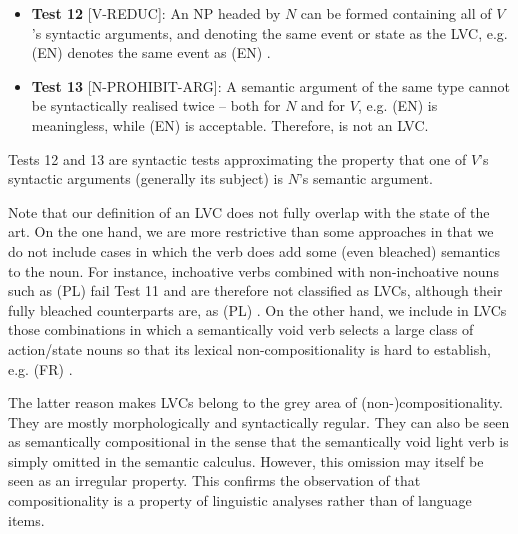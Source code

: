 \documentclass[output=paper,
modfonts,
]{langscibook}
\begin{document}
\begin{itemize}
\item[] \textbf{Test 12} [V-REDUC]: An NP headed by $N$ can be formed containing all of $V$'s syntactic arguments, and denoting the same event or state as the LVC, e.g. (EN)  denotes the same event as (EN) . 

\item[] \textbf{Test 13} [N-PROHIBIT-ARG]: A semantic argument of the same type cannot be syntactically realised twice -- both for $N$ and for $V$, e.g. (EN)  is meaningless, while (EN)  is acceptable. Therefore,  is not an LVC. %
    
\end{itemize}

Tests 12 and 13 are syntactic tests approximating the property that one of $V$'s syntactic arguments (generally its subject) is $N$'s semantic argument.

Note that our definition of an LVC does not fully overlap with the state of the art. On the one hand, we are more restrictive than some approaches in that we do not include cases in which the verb does add some (even bleached) semantics to the noun. For instance, inchoative verbs combined with non-inchoative nouns such as (PL)  fail Test 11 and are therefore not classified as LVCs, although their fully bleached counterparts are, as (PL) . On the other hand, we include in LVCs those combinations in which a semantically void verb selects a large class of action/state nouns so that its lexical non-com\-po\-si\-tio\-na\-li\-ty is hard to establish, e.g. (FR)  .

The latter reason makes LVCs belong to the grey area of (non-)com\-po\-si\-tio\-na\-li\-ty. 
They are mostly morphologically and syntactically regular. They can also be seen as semantically %
compositional in the sense that the semantically void light verb is simply omitted in the semantic calculus. However, this omission %
may itself be seen as an irregular property. This confirms the observation of \citet{Kracht07} that compositionality is a property of linguistic analyses rather than of language items.
\end{document}

